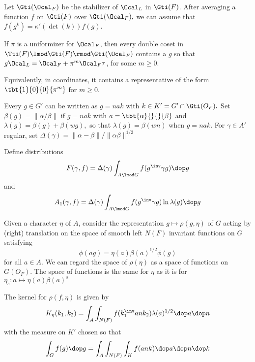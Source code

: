 Let $\Gti(\Ocal_F)$ be the stabilizer of $\Ocal_L$ in $\Gti(F)$. After averaging a function $f$ on $\Gti(F)$ over $\Gti(\Ocal_F),$ we can assume that $f(g^k)=\kappa'(\det(k))f(g)$. 

If $\pi$ is a uniformizer for $\Ocal_F$, then every double coset in $\Tti(F)\lmod \Gti(F) \rmod \Gti(\Ocal_F)$ contains a $g$ so that $g\Ocal_L=\Ocal_F + \pi ^m \Ocal_F \tau$, for some $m \geq 0$.

Equivalently, in coordinates, it contains a representative of the form $\tbt{1}{0}{0}{\pi^m}$ for $m\geq 0$.



Every $g \in G'$ can be written as $g = n a k$ with $k \in K' = G' \cap \Gti(O_F).$ Set $\beta(g) = \|\alpha/\beta\|$ if $g= n a k$ with $a =\tbt{\alpha}{}{}{\beta}$ and $\lambda(g) = \beta(g) + \beta(wg),$ so that $\lambda(g) = \beta(wn)$ when $g=nak$. For $\gamma \in A'$ regular, set $\Delta(\gamma) = \| \alpha - \beta \|/\| \alpha \beta \|^{1/2}$ 

Define distributions
\[ F(\gamma, f) = \Delta(\gamma) \int_{A \lmod G} f(g^\inv \gamma g ) \dop g \]
and 
\[ A_1(\gamma, f) = \Delta(\gamma) \int_{A\lmod G} f(g^\inv \gamma g ) \ln \lambda(g) \dop g\]


Given a character $\eta$ of $A$, consider the representation $g \mapsto \rho(g,\eta)$ of $G$ acting by (right) translation on the space of smooth left $N(F)$ invariant functions on $G$ satisfying 
\[ \phi(ag) = \eta (a)\beta(a)^{1/2}\phi(g) \]
for all $a \in A$. We can regard the space of $\rho(\eta)$ as a space of functions on $G(O_F).$ The space of functions is the same for $\eta$ as it is for $\eta_s: a \mapsto \eta(a) \beta(a)^s$

The kernel for $\rho(f,\eta)$ is given by 
\[ K_\eta(k_1,k_2) = \int_A \int_{N(F)} f(k_1^\inv a n k_2 ) \lambda(a)^{1/2} \dop a \dop n\]
with the measure on $K'$ chosen so that 
\[ \int_G f(g) \dop g = \int_A \int_{N(F)} \int_K f(ank) \dop a \dop n \dop k\]






